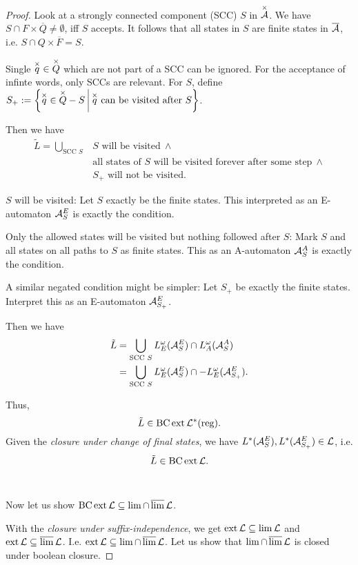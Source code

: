 \begin{theorem}
\begin{proof}
Look at a strongly connected component (SCC) $S$ in $\overset{\times}{\mathcal{A}}$. We have $S \cap F \times \overline Q \neq \emptyset$, iff $S$ accepts. It follows that all states in $S$ are finite states in $\overline {\mathcal{A}}$, i.e. $S \cap Q \times \overline F = S$.

Single $\overset{\times}{q} \in \overset{\times}{Q}$ which are not part of a SCC can be ignored. For the acceptance of infinte words, only SCCs are relevant. For $S$, define $S_+ := \Set{\overx{q} \in \overx{Q}-S}{\overx{q} \text{ can be visited after } S}$.

Then we have
\begin{align*}
\tilde L = \bigcup_{\text{SCC } S} & S \text{ will be visited} \ \wedge \\
& \text{all states of } S \text{ will be visited forever after some step} \ \wedge \\
& S_+ \text{ will not be visited} .
\end{align*}

$S$ will be visited: Let $S$ exactly be the finite states. This interpreted as an E-automaton $\mathcal{A}^E_S$ is exactly the condition.

Only the allowed states will be visited but nothing followed after $S$: Mark $S$ and all states on all paths to $S$ as finite states. This as an A-automaton $\mathcal{A}^A_S$ is exactly the condition.

A similar negated condition might be simpler: Let $S_+$ be exactly the finite states. Interpret this as an E-automaton $\mathcal{A}^E_{S_+}$.

Then we have
\begin{align*}
\tilde L & = \bigcup_{\text{SCC } S} L^\omega_E (\mathcal{A}^E_S) \cap L^\omega_A (\mathcal{A}^A_S) \\
& = \bigcup_{\text{SCC } S} L^\omega_E (\mathcal{A}^E_S) \cap -L^\omega_E (\mathcal{A}^E_{S_+}) .
\end{align*}

Thus,
\[ \tilde L \in \operatorname{BC} \operatorname{ext} \mathcal{L}^*(\textup{\textrm{reg}}) . \]
Given the \emph{closure under change of final states}, we have $L^*(\mathcal{A}^E_S), L^*(\mathcal{A}^E_{S_+}) \in \mathcal{L}$, i.e.
\[ \tilde L \in \operatorname{BC} \operatorname{ext} \mathcal{L} . \]

\

Now let us show $\operatorname{BC} \operatorname{ext} \mathcal{L} \subseteq \lim \cap \operatorname{\overline{lim}} \mathcal{L}$.

With the \emph{closure under suffix-independence}, we get $\operatorname{ext} \mathcal{L} \subseteq \lim \mathcal{L}$ and $\operatorname{ext} \mathcal{L} \subseteq \operatorname{\overline{lim}} \mathcal{L}$. I.e. $\operatorname{ext} \mathcal{L} \subseteq \lim \cap \operatorname{\overline{lim}} \mathcal{L}$. Let us show that $\lim \cap \operatorname{\overline{lim}} \mathcal{L}$ is closed under boolean closure.


\end{proof}
\end{theorem}
